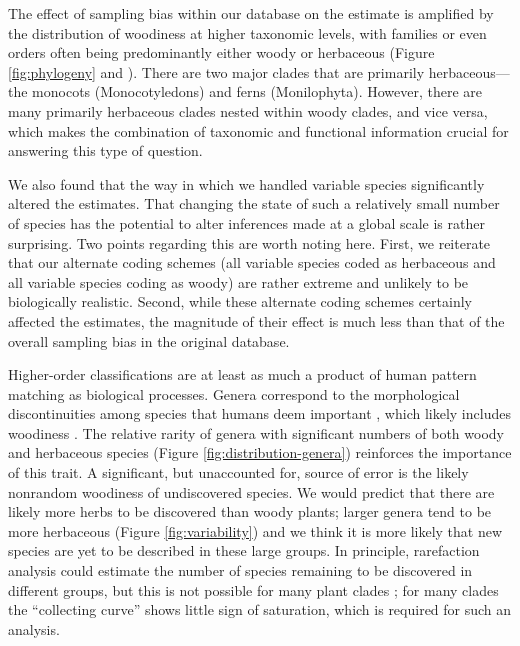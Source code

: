The effect of sampling bias within our database on the estimate is
amplified by the distribution of woodiness at higher taxonomic levels,
with families or even orders often being predominantly either woody or
herbaceous (Figure \ref{fig:phylogeny} and
\citealt{sinnott1915evolution}).  There are two major clades that are
primarily herbaceous---the monocots (Monocotyledons) and ferns
(Monilophyta). However, there are many primarily herbaceous clades
nested within woody clades, and vice versa, which makes the
combination of taxonomic and functional information crucial for
answering this type of question.

We also found that the way in which we handled variable species
significantly altered the estimates. That changing the state of such a
relatively small number of species has the potential to alter
inferences made at a global scale is rather surprising. Two points
regarding this are worth noting here. First, we reiterate that our
alternate coding schemes (all variable species coded as herbaceous and
all variable species coding as woody) are rather extreme and unlikely
to be biologically realistic. Second, while these alternate coding
schemes certainly affected the estimates, the magnitude of their
effect is much less than that of the overall sampling bias in the
original database.

Higher-order classifications are at least as much a product of human
pattern matching as biological processes.  Genera correspond to the
morphological discontinuities among species that humans deem important
\citep{scotland2004significance}, which likely includes woodiness
\citep[e.g.,][]{Hutchinson}.  The relative rarity of genera with
significant numbers of both woody and herbaceous species (Figure
\ref{fig:distribution-genera}) reinforces the importance of this
trait.  A significant, but unaccounted for, source of error is the
likely nonrandom woodiness of undiscovered species. We would predict
that there are likely more herbs to be discovered than woody plants;
larger genera tend to be more herbaceous (Figure \ref{fig:variability}) and we
think it is more likely that new species are yet to be described in
these large groups.  In principle, rarefaction analysis could estimate
the number of species remaining to be discovered in different groups,
but this is not possible for many plant clades \citep{costello2011};
for many clades the ``collecting curve'' shows little sign of
saturation, which is required for such an analysis.

